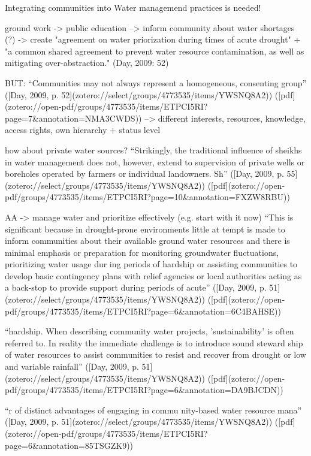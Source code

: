 Integrating communities into Water managemend practices is needed!

ground work -> public education --> inform community about water shortages (?) -> create "agreement on water priorization during times of acute drought" + "a common shared agreement to prevent water resource contamination, as well as mitigating over-abstraction." (Day, 2009: 52)

BUT:
“Communities may not always represent a homogeneous, consenting group” ([Day, 2009, p. 52](zotero://select/groups/4773535/items/YWSNQ8A2)) ([pdf](zotero://open-pdf/groups/4773535/items/ETPCI5RI?page=7&annotation=NMA3CWDS))
--> different interests, resources, knowledge, access rights, own hierarchy + status level

how about private water sources?
“Strikingly, the traditional influence of sheikhs in water management does not, however, extend to supervision of private wells or boreholes operated by farmers or individual landowners. Sh” ([Day, 2009, p. 55](zotero://select/groups/4773535/items/YWSNQ8A2)) ([pdf](zotero://open-pdf/groups/4773535/items/ETPCI5RI?page=10&annotation=FXZW8RBU))

AA -> manage water and prioritize effectively (e.g. start with it now)
“This is significant because in drought-prone environments little at tempt is made to inform communities about their available ground water resources and there is minimal emphasis or preparation for monitoring groundwater fluctuations, prioritizing water usage dur ing periods of hardship or assisting communities to develop basic contingency plans with relief agencies or local authorities acting as a back-stop to provide support during periods of acute” ([Day, 2009, p. 51](zotero://select/groups/4773535/items/YWSNQ8A2)) ([pdf](zotero://open-pdf/groups/4773535/items/ETPCI5RI?page=6&annotation=6C4BAHSE))

“hardship. When describing community water projects, 'sustainability' is often referred to. In reality the immediate challenge is to introduce sound steward ship of water resources to assist communities to resist and recover from drought or low and variable rainfall” ([Day, 2009, p. 51](zotero://select/groups/4773535/items/YWSNQ8A2)) ([pdf](zotero://open-pdf/groups/4773535/items/ETPCI5RI?page=6&annotation=DA9BJCDN))


“r of distinct advantages of engaging in commu nity-based water resource mana” ([Day, 2009, p. 51](zotero://select/groups/4773535/items/YWSNQ8A2)) ([pdf](zotero://open-pdf/groups/4773535/items/ETPCI5RI?page=6&annotation=85TSGZK9))

